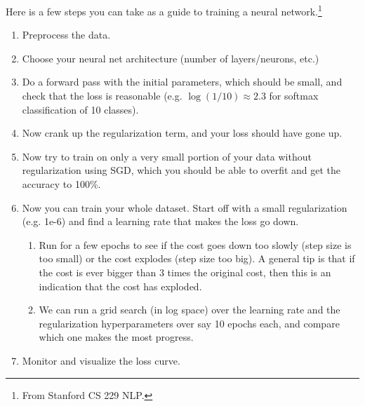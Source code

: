   Here is a few steps you can take as a guide to training a neural network.\footnote{From Stanford CS 229 NLP.}
  \begin{enumerate}
    \item Preprocess the data. 
    \item Choose your neural net architecture (number of layers/neurons, etc.) 
    \item Do a forward pass with the initial parameters, which should be small, and check that the loss is reasonable (e.g. $\log(1/10) \approx 2.3$ for softmax classification of 10 classes). 
    \item Now crank up the regularization term, and your loss should have gone up. 
    \item Now try to train on only a very small portion of your data without regularization using SGD, which you should be able to overfit and get the accuracy to 100\%. 
    \item Now you can train your whole dataset. Start off with a small regularization (e.g. 1e-6) and find a learning rate that makes the loss go down. 
    \begin{enumerate}
        \item Run for a few epochs to see if the cost goes down too slowly (step size is too small) or the cost explodes (step size too big). A general tip is that if the cost is ever bigger than $3$ times the original cost, then this is an indication that the cost has exploded. 
        \item We can run a grid search (in log space) over the learning rate and the regularization hyperparameters over say 10 epochs each, and compare which one makes the most progress. 
    \end{enumerate}
    \item Monitor and visualize the loss curve. 

    \begin{figure}[H]
      \centering 
\end{figure}
\end{enumerate}
